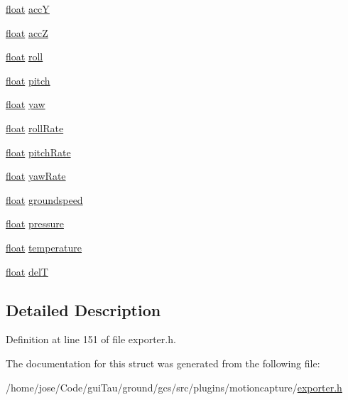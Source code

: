 \begin{DoxyCompactItemize}
\item 
\hyperlink{_super_l_u_support_8h_a6a1bb6ed41f44b60e7bd83b0e9945aa7}{float} \hyperlink{group___mo_cap_plugin_gad47738d7c1cd424f7d9508b4d44a4043}{acc\-Y}
\item 
\hyperlink{_super_l_u_support_8h_a6a1bb6ed41f44b60e7bd83b0e9945aa7}{float} \hyperlink{group___mo_cap_plugin_gae919304b20a26d362f67b32533118ce7}{acc\-Z}
\item 
\hyperlink{_super_l_u_support_8h_a6a1bb6ed41f44b60e7bd83b0e9945aa7}{float} \hyperlink{group___mo_cap_plugin_ga6db93cd0e529bbfcb33af3293ab16c62}{roll}
\item 
\hyperlink{_super_l_u_support_8h_a6a1bb6ed41f44b60e7bd83b0e9945aa7}{float} \hyperlink{group___mo_cap_plugin_ga5e6750ec09f6ef2ebd014c746421e952}{pitch}
\item 
\hyperlink{_super_l_u_support_8h_a6a1bb6ed41f44b60e7bd83b0e9945aa7}{float} \hyperlink{group___mo_cap_plugin_ga423b4c125aa4c8caf1001d16de1dd3f9}{yaw}
\item 
\hyperlink{_super_l_u_support_8h_a6a1bb6ed41f44b60e7bd83b0e9945aa7}{float} \hyperlink{group___mo_cap_plugin_ga178bcd8c81449eb7c9cc5c5bb203e591}{roll\-Rate}
\item 
\hyperlink{_super_l_u_support_8h_a6a1bb6ed41f44b60e7bd83b0e9945aa7}{float} \hyperlink{group___mo_cap_plugin_ga03ecf7a98f0b6197c65a71fa1e2a1237}{pitch\-Rate}
\item 
\hyperlink{_super_l_u_support_8h_a6a1bb6ed41f44b60e7bd83b0e9945aa7}{float} \hyperlink{group___mo_cap_plugin_gaddfb563223971f02a45ebd14034b2a06}{yaw\-Rate}
\item 
\hyperlink{_super_l_u_support_8h_a6a1bb6ed41f44b60e7bd83b0e9945aa7}{float} \hyperlink{group___mo_cap_plugin_gab0735b3db4133ae25e01a4ee6dc3347f}{groundspeed}
\item 
\hyperlink{_super_l_u_support_8h_a6a1bb6ed41f44b60e7bd83b0e9945aa7}{float} \hyperlink{group___mo_cap_plugin_ga521e946322d097a3b14b24f53ce1568f}{pressure}
\item 
\hyperlink{_super_l_u_support_8h_a6a1bb6ed41f44b60e7bd83b0e9945aa7}{float} \hyperlink{group___mo_cap_plugin_gaa66ae80cf0902b622dea302a9a588fe8}{temperature}
\item 
\hyperlink{_super_l_u_support_8h_a6a1bb6ed41f44b60e7bd83b0e9945aa7}{float} \hyperlink{group___mo_cap_plugin_ga0c6d6722adb60229659cfe26d61ec953}{del\-T}
\end{DoxyCompactItemize}


\subsection{Detailed Description}


Definition at line 151 of file exporter.\-h.



The documentation for this struct was generated from the following file\-:\begin{DoxyCompactItemize}
\item 
/home/jose/\-Code/gui\-Tau/ground/gcs/src/plugins/motioncapture/\hyperlink{exporter_8h}{exporter.\-h}\end{DoxyCompactItemize}
